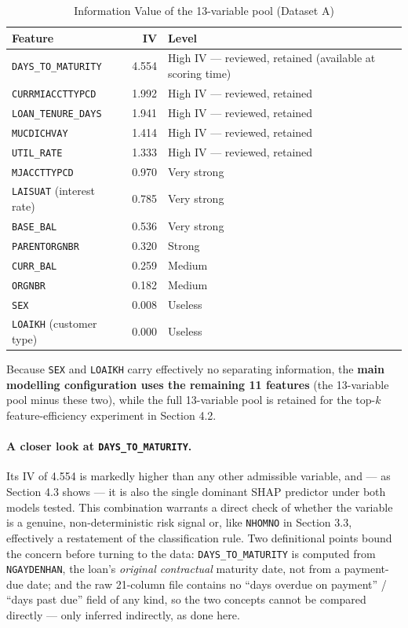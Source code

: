 \documentclass[11pt,a4paper]{article}
\begin{document}
\begin{table}[H]
\centering
\caption{Information Value of the 13-variable pool (Dataset A)}
\begin{tabular}{lrp{6.6cm}}
\toprule
Feature & IV & Level \\
\midrule
\texttt{DAYS\_TO\_MATURITY} & 4.554 & High IV --- reviewed, retained (available at scoring time) \\
\texttt{CURRMIACCTTYPCD} & 1.992 & High IV --- reviewed, retained \\
\texttt{LOAN\_TENURE\_DAYS} & 1.941 & High IV --- reviewed, retained \\
\texttt{MUCDICHVAY} & 1.414 & High IV --- reviewed, retained \\
\texttt{UTIL\_RATE} & 1.333 & High IV --- reviewed, retained \\
\texttt{MJACCTTYPCD} & 0.970 & Very strong \\
\texttt{LAISUAT} (interest rate) & 0.785 & Very strong \\
\texttt{BASE\_BAL} & 0.536 & Very strong \\
\texttt{PARENTORGNBR} & 0.320 & Strong \\
\texttt{CURR\_BAL} & 0.259 & Medium \\
\texttt{ORGNBR} & 0.182 & Medium \\
\texttt{SEX} & 0.008 & Useless \\
\texttt{LOAIKH} (customer type) & 0.000 & Useless \\
\bottomrule
\end{tabular}
\end{table}

Because \texttt{SEX} and \texttt{LOAIKH} carry effectively no separating information, the \textbf{main modelling configuration uses the remaining 11 features} (the 13-variable pool minus these two), while the full 13-variable pool is retained for the top-$k$ feature-efficiency experiment in Section 4.2.

\paragraph{A closer look at \texttt{DAYS\_TO\_MATURITY}.} Its IV of 4.554 is markedly higher than any other admissible variable, and --- as Section 4.3 shows --- it is also the single dominant SHAP predictor under both models tested. This combination warrants a direct check of whether the variable is a genuine, non-deterministic risk signal or, like \texttt{NHOMNO} in Section 3.3, effectively a restatement of the classification rule. Two definitional points bound the concern before turning to the data: \texttt{DAYS\_TO\_MATURITY} is computed from \texttt{NGAYDENHAN}, the loan's \textit{original contractual} maturity date, not from a payment-due date; and the raw 21-column file contains no ``days overdue on payment'' / ``days past due'' field of any kind, so the two concepts cannot be compared directly --- only inferred indirectly, as done here.
\end{document}

